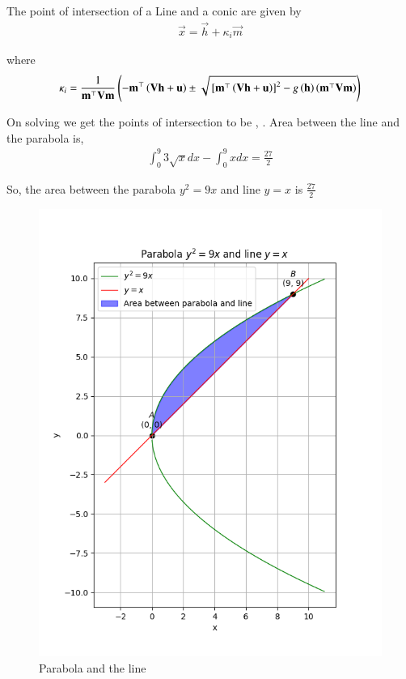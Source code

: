 \documentclass[journal]{IEEEtran}
\begin{document}
	The point of intersection of a Line and a conic are given by 
	\begin{align}
		\vec{x} = \vec{h} + \kappa_i \vec{m}
	\end{align}
	
	where
	\begin{align}
		\kappa_{i} = \frac{1}{\mathbf{m}^{\top} \mathbf{V} \mathbf{m}} \left(-\mathbf{m}^\top \left(\mathbf{V} \mathbf{h} + \mathbf{u}\right) \pm \sqrt{{}\left[\mathbf{m}^\top \left(\mathbf{V} \mathbf{h} + \mathbf{u}\right)\right]^2 - g\left(\mathbf{h}\right) \left(\mathbf{m}^\top \mathbf{V} \mathbf{m}\right)}\right)
	\end{align}

	On solving we get the points of intersection to be  , . Area between the line and the parabola is,
	\begin{align}
		\int_0^9 3\sqrt{x}dx - \int_0^9 x dx = \frac{27}{2}
	\end{align}

	So, the area between the parabola $y^2 = 9x$ and line $y=x$ is $\frac{27}{2}$

	\begin{figure}[h!]
   		\centering
   		\includegraphics[width = 1\linewidth]{plots/plot.png}
   		\caption{Parabola and the line}
   		\label{stemplot}
	\end{figure}
\end{document}
